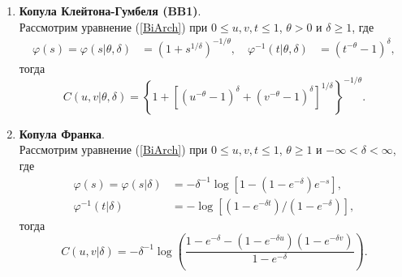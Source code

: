 \begin{enumerate}
\item \textbf{Копула Клейтона-Гумбеля (BB1)}.\\
Рассмотрим уравнение (\ref{BiArch}) при $0 \le u, v, t \le 1$, $\theta > 0$ и $\delta \ge 1$, где
\begin{equation}
\begin{aligned}
    \varphi (s) = \varphi(s| \theta, \delta) &= (1 + s^{1/\delta})^{-1/\theta}, \quad %
    \varphi^{-1}(t| \theta, \delta) &= (t^{-\theta} - 1)^\delta,
\end{aligned} \nonumber 
\end{equation}
тогда
\begin{equation}
    C(u,v|\theta,\delta) = \left\{1 + [(u^{-\theta} - 1)^\delta + (v^{-\theta} - 1)^\delta]^{1/\delta} \right\}^{-1/\theta}. \nonumber
\end{equation}


\item \textbf{Копула Франка}.\\
Рассмотрим уравнение (\ref{BiArch}) при $0 \le u, v, t \le 1$, $\theta \ge 1$ и $-\infty < \delta < \infty$, где
\begin{equation}
\begin{aligned}
    \varphi (s) = \varphi(s| \delta) &= -\delta^{-1}\log{[1-(1-e^{-\delta})e^{-s}]}, \\
    \varphi^{-1}(t| \delta) &= -\log{[(1-e^{-\delta t})/(1-e^{-\delta})]},
\end{aligned} \nonumber 
\end{equation}
тогда
\begin{equation}
    C(u,v|\delta) = -\delta^{-1} \log{\left(\frac{1 - e^{-\delta} - (1 - e^{-\delta u})(1 - e^{-\delta v})}{1 - e^{-\delta}}\right)}. \nonumber
    \end{equation}


\end{enumerate}
